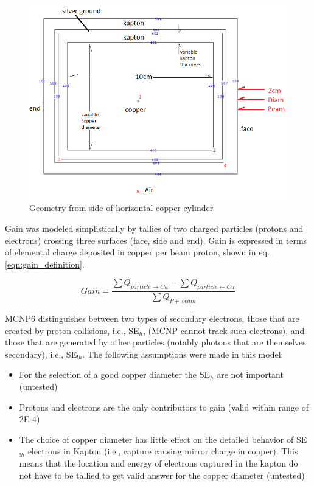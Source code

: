 \documentclass{mc2015}
\begin{document}
\begin{figure}[H]
  \centering
  \includegraphics[width=5in]{figures/fig_geometry.png}
  \caption{Geometry from side of horizontal copper cylinder}
  \label{fig:model_geometry}
\end{figure}

Gain was modeled simplistically by tallies of two charged particles (protons and electrons) crossing three surfaces (face, side and end). Gain is expressed in terms of elemental charge deposited in copper per beam proton, shown in eq. \ref{eqn:gain_definition}.

\begin{equation}
Gain = \frac{\sum Q_{particle\rightarrow Cu} - \sum Q_{particle\leftarrow Cu}}{\sum Q_{P+\ beam}}
\label{eqn:gain_definition}
\end{equation}

MCNP6 distinguishes between two types of secondary electrons, those that are created by proton collisions, i.e., SE$_h$, (MCNP cannot track such electrons), and those that are generated by other particles (notably photons that are themselves secondary), i.e., SE$_{!h}$. The following assumptions were made in this model:

\begin{itemize}
\item For the selection of a good copper diameter the SE$_h$ are not important (untested)
\item Protons and electrons are the only contributors to gain (valid within range of 2E-4)
\item The choice of copper diameter has little effect on the detailed behavior of SE$_{!h}$ electrons in Kapton (i.e., capture causing mirror charge in copper). This means that the location and energy of electrons captured in the kapton do not have to be tallied to get valid answer for the copper diameter (untested)
\end{itemize}
\end{document}
